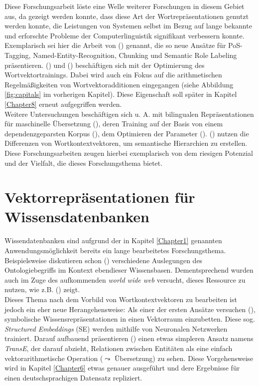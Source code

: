 Diese Forschungsarbeit löste eine Welle weiterer Forschungen in diesem Gebiet aus, da gezeigt werden konnte, dass diese
Art der Wortrepräsentationen genutzt werden konnte, die Leistungen von Systemen selbst im Bezug auf lange bekannte und
erforschte Probleme der Computerlinguistik signifikant verbessern konnte. Exemplarisch sei hier die Arbeit von
(\cite{collobert2011natural}) genannt, die so neue Ansätze für PoS-Tagging, Named-Entity-Recognition, Chunking und Semantic
Role Labeling präsentieren. (\cite{mikolov2013efficient}) und (\cite{mikolov2013distributed}) beschäftigen sich mit der
Optimierung des Wortvektortrainings. Dabei wird auch ein Fokus auf die arithmetischen Regelmäßigkeiten von Wortvektoradditionen
eingegangen (siehe Abbildung \ref{fig:capitals} im vorherigen Kapitel). Diese Eigenschaft soll später in Kapitel \ref{Chapter8} erneut
aufgegriffen werden.\\

Weitere Untersuchungen beschäftigen sich u. A. mit bilingualen Repräsentationen für maschinelle Übersetzung (\cite{zou2013bilingual}),
deren Training auf der Basis von einem dependenzgeparsten Korpus (\cite{levy2014dependency}), dem Optimieren der Parameter
(\cite{levy2015improving}). (\cite{fu2014learning}) nutzen die Differenzen von Wortkontextvektoren, um semantische
Hierarchien zu erstellen.\\
Diese Forschungsarbeiten zeugen hierbei exemplarisch von dem riesigen Potenzial und der Vielfalt, die dieses
Forschungsthema bietet.

\section{Vektorrepräsentationen für Wissensdatenbanken}

Wissendatenbanken sind aufgrund der in Kapitel \ref{Chapter1} genannten Anwendungsmöglichkeit bereits ein lange bearbeitetes
Forschungsthema. Beispielsweise diskutieren schon (\cite{giaretta1995ontologies}) verschiedene Auslegungen des Ontologiebegriffs
im Kontext ebendieser Wissensbasen. Dementsprechend wurden auch im Zuge des aufkommenden \emph{world wide web} versucht, dieses
Ressource zu nutzen, wie z.B. (\cite{craven2000learning}) zeigt.\\
Dieses Thema nach dem Vorbild von Wortkontextvektoren zu bearbeiten ist jedoch ein eher neue Herangehensweise: Als
einer der ersten Ansätze versuchen (\cite{bordes2011learning}), symbolische Wissensrepräsentationen in einen Vektorraum
einzubetten. Diese sog. \emph{Structured Embeddings} (SE) werden mithilfe von Neuronalen Netzwerken trainiert.
Darauf aufbauend präsentieren (\cite{bordes2013translating}) einen etwas simpleren Ansatz namens \emph{TransE}, der darauf abzieht, Relationen
zwischen Entitäten als eine einfach vektorarithmetische Operation ($\leadsto$ Übersetzung) zu sehen. Diese Vorgehensweise wird in Kapitel \ref{Chapter6}
etwas genauer ausgeführt und dere Ergebnisse für einen deutschsprachigen Datensatz repliziert.\\

